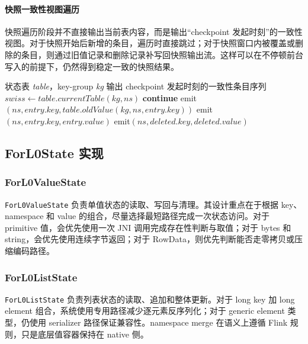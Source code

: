 \documentclass[a4paper,11pt]{article}
\begin{document}
\paragraph{快照一致性视图遍历}

快照遍历阶段并不直接输出当前表内容，而是输出“checkpoint 发起时刻”的一致性视图。对于快照开始后新增的条目，遍历时直接跳过；对于快照窗口内被覆盖或删除的条目，则通过旧值记录和删除记录补写回快照输出流。这样可以在不停顿前台写入的前提下，仍然得到稳定一致的快照结果。

\begin{algorithm}[!htbp]
\caption{快照一致性视图遍历算法}
\footnotesize
\begin{algorithmic}[1]
\Require 状态表 \textit{table}，key-group \textit{kg}
\Ensure 输出 checkpoint 发起时刻的一致性条目序列
  \State $swiss \gets table.currentTable(kg, ns)$
      \State \textbf{continue}
      \State emit$(ns, entry.key, table.oldValue(kg, ns, entry.key))$
    \Else
      \State emit$(ns, entry.key, entry.value)$
    \EndIf
  \EndFor
    \State emit$(ns, deleted.key, deleted.value)$
  \EndFor
\EndFor
\end{algorithmic}
\end{algorithm}

\subsection{ForL0State 实现}

\subsubsection{ForL0ValueState}

\texttt{ForL0ValueState} 负责单值状态的读取、写回与清理。其设计重点在于根据 key、namespace 和 value 的组合，尽量选择最短路径完成一次状态访问。对于 primitive 值，会优先使用一次 JNI 调用完成存在性判断与取值；对于 bytes 和 string，会优先使用连续字节返回；对于 RowData，则优先判断能否走零拷贝或压缩编码路径。

\subsubsection{ForL0ListState}

\texttt{ForL0ListState} 负责列表状态的读取、追加和整体更新。对于 long key 加 long element 组合，系统使用专用路径减少逐元素反序列化；对于 generic element 类型，仍使用 serializer 路径保证兼容性。namespace merge 在语义上遵循 Flink 规则，只是底层值容器保持在 native 侧。
\end{document}
